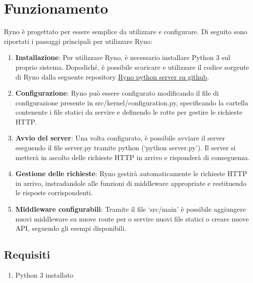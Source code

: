 \documentclass{article}
\begin{document}
\section{Funzionamento}
Ryno è progettato per essere semplice da utilizzare e configurare. Di seguito sono riportati i passaggi principali per utilizzare Ryno:

\begin{enumerate}
  \item \textbf{Installazione}: Per utilizzare Ryno, è necessario installare Python 3 sul proprio sistema. Dopodiché, è possibile scaricare e utilizzare il codice sorgente di Ryno dalla seguente repository \href{https://github.com/mtttia/Ryno}{Ryno python server su github}.
  
  \item \textbf{Configurazione}: Ryno può essere configurato modificando il file di configurazione presente in src/kernel/configuration.py, specificando la cartella contenente i file statici da servire e definendo le rotte per gestire le richieste HTTP.
  
  \item \textbf{Avvio del server}: Una volta configurato, è possibile avviare il server eseguendo il file server.py tramite python (`python server.py'). Il server si metterà in ascolto delle richieste HTTP in arrivo e risponderà di conseguenza.
  
  \item \textbf{Gestione delle richieste}: Ryno gestirà automaticamente le richieste HTTP in arrivo, instradandole alle funzioni di middleware appropriate e restituendo le risposte corrispondenti.
  
  \item \textbf{Middleware configurabili}: Tramite il file `src/main' è possibile aggiungere nuovi middleware su nuove route per o servire nuovi file statici o creare nuove API, seguendo gli esempi disponibili.
\end{enumerate}
\subsection{Requisiti}
\begin{enumerate}
    \item Python 3 installato
\end{enumerate}
\end{document}
